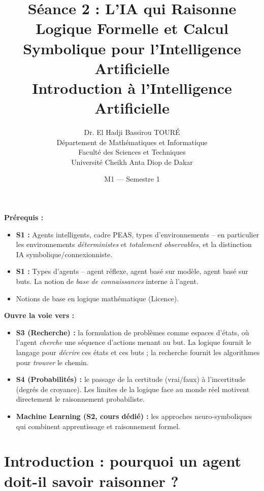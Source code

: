 \documentclass[11pt,a4paper]{article}
\title{\textbf{Séance 2 : L'IA qui Raisonne}\\
\large Logique Formelle et Calcul Symbolique pour l'Intelligence Artificielle\\[0.5cm]
\normalsize Introduction à l'Intelligence Artificielle}
\author{Dr. El Hadji Bassirou TOURÉ\\
Département de Mathématiques et Informatique\\
Faculté des Sciences et Techniques\\
Université Cheikh Anta Diop de Dakar}
\date{M1 --- Semestre 1}
\begin{document}
\maketitle

\begin{prereqbox}
\textbf{Prérequis :}
\begin{itemize}[nosep]
    \item \textbf{S1 :} Agents intelligents, cadre PEAS, types d'environnements -- en particulier les environnements \textit{déterministes} et \textit{totalement observables}, et la distinction IA symbolique/connexionniste.
    \item \textbf{S1 :} Types d'agents -- agent réflexe, agent basé sur modèle, agent basé sur buts. La notion de \textit{base de connaissances} interne à l'agent.
    \item Notions de base en logique mathématique (Licence).
\end{itemize}

\textbf{Ouvre la voie vers :}
\begin{itemize}[nosep]
    \item \textbf{S3 (Recherche) :} la formulation de problèmes comme espaces d'états, où l'agent \textit{cherche} une séquence d'actions menant au but. La logique fournit le langage pour \textit{décrire} ces états et ces buts ; la recherche fournit les algorithmes pour \textit{trouver} le chemin.
    \item \textbf{S4 (Probabilités) :} le passage de la certitude (vrai/faux) à l'incertitude (degrés de croyance). Les limites de la logique face au monde réel motivent directement le raisonnement probabiliste.
    \item \textbf{Machine Learning (S2, cours dédié) :} les approches neuro-symboliques qui combinent apprentissage et raisonnement formel.
\end{itemize}
\end{prereqbox}

\vspace{0.5cm}

\tableofcontents

\newpage

\section{Introduction : pourquoi un agent doit-il savoir raisonner ?}
\end{document}
